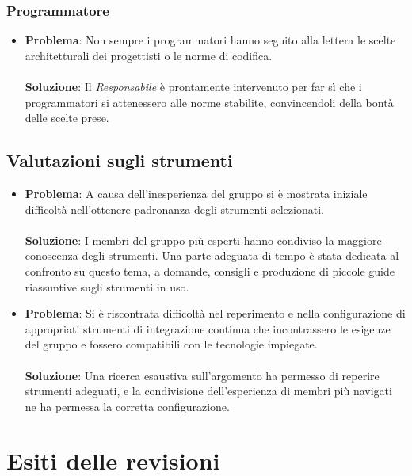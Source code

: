 \documentclass[openany,12pt,a4paper]{report}
\begin{document}
\subsection{Programmatore}
\begin{itemize}
	\item \textbf{Problema}: Non sempre i programmatori hanno seguito alla lettera le scelte architetturali dei progettisti o le norme di codifica. \\ \\
	\textbf{Soluzione}: Il \textit{Responsabile} è prontamente intervenuto per far sì che i programmatori si attenessero alle norme stabilite, convincendoli della bontà delle scelte prese.
\end{itemize}

\section{Valutazioni sugli strumenti}

\begin{itemize}
	\item \textbf{Problema}: A causa dell'inesperienza del gruppo si è mostrata iniziale difficoltà nell'ottenere padronanza degli strumenti selezionati. \\ \\
	\textbf{Soluzione}: I membri del gruppo più esperti hanno condiviso la maggiore conoscenza degli strumenti. Una parte adeguata di tempo è stata dedicata al confronto su questo tema, a domande, consigli e produzione di piccole guide riassuntive sugli strumenti in uso.
\end{itemize}

\begin{itemize}
	\item \textbf{Problema}: Si è riscontrata difficoltà nel reperimento e nella configurazione di appropriati strumenti di integrazione continua che incontrassero le esigenze del gruppo e fossero compatibili con le tecnologie impiegate. \\ \\
	\textbf{Soluzione}: Una ricerca esaustiva sull'argomento ha permesso di reperire strumenti adeguati, e la condivisione dell'esperienza di membri più navigati ne ha permessa la corretta configurazione.
\end{itemize}

\chapter{Esiti delle revisioni}
\end{document}
